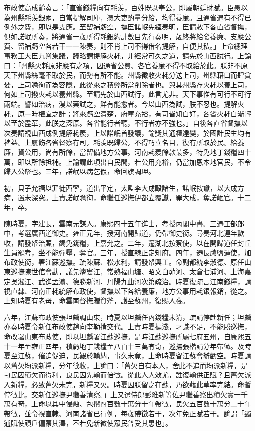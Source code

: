 \begin{pinyinscope}
布政使高成齡奏言：「直省錢糧向有耗羨，百姓既以奉公，即屬朝廷財賦。臣愚以為州縣耗羨銀兩，自當提解司庫，憑大吏酌量分給，均得養廉。且通省遇有不得已例外之費，即以是支應。至留補虧空，撫臣諾岷先經奏明，臣請敕下各直省督撫，俱如諾岷所奏，將通省一歲所得耗銀約計數目先行奏明，歲終將給發養廉、支應公費、留補虧空各若干一一陳奏，則不肖上司不得借名提解，自便其私。」上命總理事務王大臣九卿集議，議略謂提解火耗，非經常可久之道，請先於山西試行。上諭曰：「州縣火耗原非應有之項，因通省公費、各官養廉不得不取給於此。朕非不原天下州縣絲毫不取於民，而勢有所不能。州縣徵收火耗分送上司，州縣藉口而肆貪婪，上司瞻徇而為容隱，此從來之積弊所當削除者也。與其州縣存火耗以養上司，何如上司撥火耗以養州縣。至請先於山西試行，此言尤非。天下事惟有可行不可行兩端。譬如治病，漫以藥試之，鮮有能愈者。今以山西為試，朕不忍也。提解火耗，原一時權宜之計；將來虧空清楚，府庫充裕，有司皆知自好，各省火耗自漸輕以至於盡革，此朕之深原。各省能行者聽，不行者亦不強也。」自後各直省督撫以次奏請視山西成例提解耗羨，上以諾岷首發議，諭獎其通權達變，於國計民生均有裨益。上屢飭各省督察有司，耗羨既歸公，不得巧立名目，復有所取於民。給養廉，資公用，尚有所餘，當留備地方公事。河南耗羨餘款最多，特免地丁錢糧四十萬，即以所餘抵補。上諭謂此項出自民間，若公用充裕，仍當加恩本地官民，不令歸入公帑也。三年，諾岷以病乞假，命回旗調理。

初，貝子允禟以罪徙西寧，道出平定，太監李大成毆諸生，諾岷按讞，以大成方病，置未深究。上責諾岷瞻徇，命繼任巡撫伊都立覆讞，罪大成，奪諾岷官。十二年，卒。

陳時夏，字建長，雲南元謀人。康熙四十五年進士，考授內閣中書。三遷工部郎中，考選廣西道御史。雍正元年，授河南開歸道，仍帶御史銜。尋奏河北連年歉收，請發帑治賑，蠲免錢糧，上嘉允之。二年，遷湖北按察使，以在開歸道任封丘生員罷考，坐不能彈壓，奪官。三年，授直隸正定知府。四年，遷長蘆鹽運使，加布政使銜，署江蘇巡撫。疏陳蘇、松水利，請發帑興工。命副都統李淑德、原任山東巡撫陳世倌會勘，議先濬婁江，常熟福山塘、昭文白茆河、太倉七浦河、上海嘉定吳淞江、武進孟瀆、德勝新河、丹陽九曲河次第疏治。時夏復疏言江南錢糧，請視直隸、河南正耗統解布政使，督撫以下各給養廉，地方公事用耗銀報銷，從之。上知時夏有老母，命雲南督撫贈資斧，護至蘇州，復賜人葠。

六年，江蘇布政使張坦麟調山東，時夏以坦麟任內錢糧未清，疏請停赴新任；坦麟亦奏時夏令新任布政使趙向奎勒掯交代。上責時夏褊淺，才識不足，不能勝巡撫，命改署山東布政使，即以坦麟署江蘇巡撫。是時江蘇巡撫所屬七府五州，自康熙五十一年至雍正四年，積虧地丁錢糧至八百十三萬有奇，巡撫張楷請分年帶徵。及時夏至江蘇，催追促迫，民艱於輸納，事久未竟，上命時夏留江蘇會辦虧空。時夏請以舊欠均派新糧，分年徵收，上諭曰：「舊欠自有本人，舍此不追而均派新糧，是刁民因積欠而得利，良民因先輸而倍徵。從此人人效尤，誰復輸供正賦？且舊欠派入新糧，必致舊欠未完，新糧又欠。時夏因朕留之在蘇，乃欲藉此草率完結。命暫停徵比，交新任巡撫尹繼善清察。」上又遣侍郎彭維新等佐尹繼善察出積欠實一千萬有奇，上命以其中侵蝕、包攬四百數十萬分十年帶徵，民欠五百數十萬分二十年帶徵，並令視直隸、河南諸省已行例，每歲帶徵若干，次年免正賦若干。諭謂「蠲逋賦使頑戶偏蒙其澤，不若免新徵使眾民普受其惠也」。


\end{pinyinscope}

